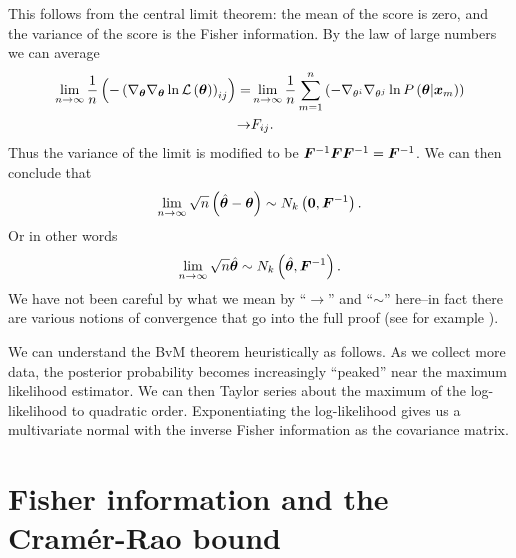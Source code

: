 This follows from the central limit theorem: the mean of the score is zero, 
and the variance of the score is the Fisher information.
By the law of large numbers we can average
\begin{align}
    \lim_{n\to\infty}
    \frac{1}{n}\left(-\left(\nabla_{{\bm \theta}}\nabla_{{\bm \theta}}\ln\mathcal{L}\left({\bm \theta}\right)\right)_{ij}\right)
    =&
    \lim_{n\to\infty}
    \frac{1}{n}\sum_{m=1}^n
    \left(-\nabla_{\theta^i}\nabla_{\theta^j}\ln P\left({\bm \theta}|{\bm x}_{m}\right)\right)
    \nonumber\\
    \to&
    F_{ij}
    .
\end{align}
Thus the variance of the limit is modified to be ${\bm F}^{-1}{\bm F}{\bm F}^{-1}={\bm F}^{-1}$.
We can then conclude that
\begin{align}
    \lim_{n\to\infty}\sqrt{n}\left(\hat{{\bm \theta}} - {\bm \theta}\right)
    \sim
    N_k\left({\bm 0},{\bm F}^{-1}\right)
    .
\end{align}
Or in other words
\begin{align}
    \lim_{n\to\infty}\sqrt{n}\hat{{\bm \theta}}
    \sim
    N_k\left(\hat{{\bm \theta}},{\bm F}^{-1}\right)
    .
\end{align}
We have not been careful by what we mean by ``$\to$'' and ``$\sim$'' here--in fact there
are various notions of convergence that go into the full proof
(see for example \cite{wasserman2010statistics}).

We can understand the BvM theorem heuristically as follows.
As we collect more data, the posterior probability becomes increasingly ``peaked'' near
the maximum likelihood estimator.
We can then Taylor series about the maximum of the log-likelihood to quadratic order.
Exponentiating the log-likelihood gives us a multivariate normal with the 
inverse Fisher information as the covariance matrix.

\section{Fisher information and the Cram\'{e}r-Rao bound}

